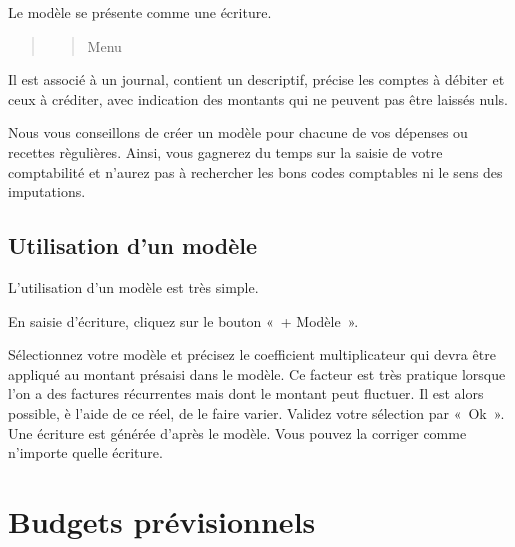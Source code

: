 \documentclass[a4paper,10pt,oneside,french]{sphinxmanual}
\begin{document}
\sphinxAtStartPar
Le modèle se présente comme une écriture.
\begin{quote}
\begin{quote}

\sphinxAtStartPar
Menu 
\end{quote}

\noindent{}
\end{quote}

\sphinxAtStartPar
Il est associé à un journal, contient un descriptif, précise les comptes à débiter et ceux à créditer, avec indication des montants qui ne peuvent pas être laissés nuls.
\begin{quote}

\noindent{}
\end{quote}

\sphinxAtStartPar
Nous vous conseillons de créer un modèle pour chacune de vos dépenses ou recettes règulières. Ainsi, vous gagnerez du temps sur la saisie de votre comptabilité et n’aurez pas à rechercher les bons codes comptables ni le sens des imputations.


\subsection{Utilisation d’un modèle}
\label{\detokenize{accounting/model:utilisation-d-un-modele}}
\sphinxAtStartPar
L’utilisation d’un modèle est très simple.

\sphinxAtStartPar
En saisie d’écriture, cliquez sur le bouton « + Modèle ».
\begin{quote}

\noindent{}
\end{quote}

\sphinxAtStartPar
Sélectionnez votre modèle et précisez le coefficient multiplicateur qui devra être appliqué au montant présaisi dans le modèle. Ce facteur est très pratique lorsque l’on a des factures récurrentes mais dont le montant peut fluctuer. Il est alors possible, è l’aide de ce réel, de le faire varier.
Validez votre sélection par « Ok ». Une écriture est générée d’après le modèle. Vous pouvez la corriger comme n’importe quelle écriture.

\sphinxstepscope


\section{Budgets prévisionnels}
\label{\detokenize{accounting/budget:budgets-previsionnels}}\label{\detokenize{accounting/budget::doc}}
\end{document}
